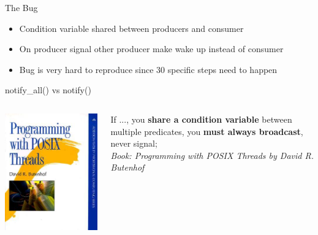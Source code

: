 \documentclass[12pt]{beamer}
\begin{document}
  \begin{frame}{The Bug}
    \begin{itemize}
      \item Condition variable shared between producers and consumer
      \item On producer signal other producer make wake up instead of consumer
      \item Bug is very hard to reproduce since 30 specific steps need to happen
    \end{itemize}
  \end{frame}
  \begin{frame}{notify\_all() vs notify()}
    \begin{columns}[T] %
      \begin{column}{.48\textwidth}
        \begin{center}
            \includegraphics[scale=3.0]{figures/posix_threads}
        \end{center}
      \end{column}%
      \begin{column}{.48\textwidth}
          If ..., you \textbf{share a condition variable} between multiple
          predicates, you \textbf{must always broadcast}, never signal; \\
          \textit{Book: Programming with POSIX Threads by David R. Butenhof}
      \end{column}%
    \end{columns}
  \end{frame}
\end{document}
